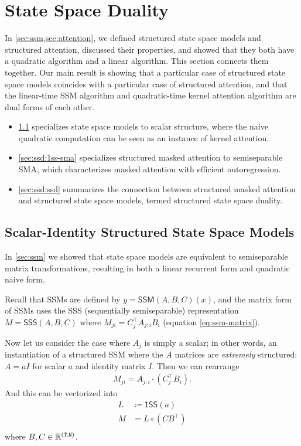 \section{State Space Duality}
\label{sec:ssd}

In \cref{sec:ssm,sec:attention}, we defined structured state space models and structured attention,
discussed their properties, and showed that they both have a quadratic algorithm and a linear algorithm.
This section connects them together.
Our main result is showing that a particular case of structured state space models coincides with a particular case of structured attention,
and that the linear-time SSM algorithm and quadratic-time kernel attention algorithm are dual forms of each other.
\begin{itemize}
  \item \cref{sec:ssd:quadratic-ssm} specializes state space models to scalar structure, where the naive quadratic computation can be seen as an instance of kernel attention.
  \item \cref{sec:ssd:1ss-sma} specializes structured masked attention to semiseparable SMA, which characterizes masked attention with efficient autoregression.
  \item \cref{sec:ssd:ssd} summarizes the connection between structured masked attention and structured state space models, termed structured state space duality.
\end{itemize}

\subsection{Scalar-Identity Structured State Space Models}
\label{sec:ssd:quadratic-ssm}


In \cref{sec:ssm} we showed that state space models are equivalent to semiseparable matrix transformations,
resulting in both a linear recurrent form and quadratic naive form.

Recall that SSMs are defined by $y = \mathsf{SSM}(A, B, C)(x)$, and the matrix form of SSMs uses the SSS (sequentially semiseparable) representation
$M = \mathsf{SSS}(A, B, C)$ where
$M_{ji} = C_j^{\top} A_{j:i} B_i$ (equation \eqref{eq:ssm-matrix}).

Now let us consider the case where $A_j$ is simply a scalar;
in other words, an instantiation of a structured SSM where the $A$ matrices are \emph{extremely} structured: $A = aI$ for scalar $a$ and identity matrix $I$.
Then we can rearrange
\begin{align*}
  M_{ji} = A_{j:i} \cdot (C_j^{\top}B_i)
.
\end{align*}
And this can be vectorized into
\begin{align*}%
  L &\coloneqq \mathsf{1SS}(a) \\
  M &= L \circ (C B^{\top}) \\
\end{align*}
where $B, C \in \mathbb{R}^{\mathtt{(T,N)}}$.

